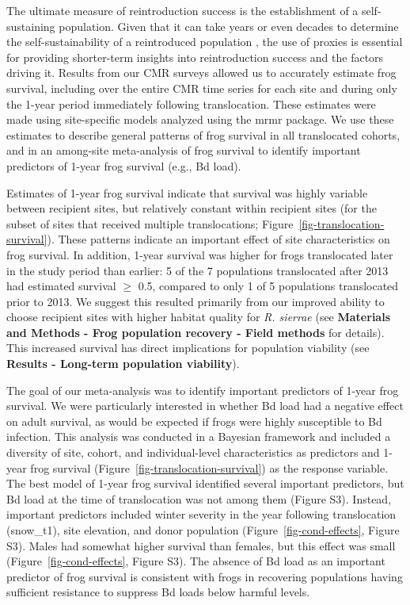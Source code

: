\documentclass[9pt,twocolumn,twoside,lineno]{pnas-new}
\begin{document}
The ultimate measure of reintroduction success is the establishment of a
self-sustaining population. Given that it can take years or even decades
to determine the self-sustainability of a reintroduced population
\citep[for an example in MYL frogs, see][]{joseph2018}, the use of
proxies is essential for providing shorter-term insights into
reintroduction success and the factors driving it. Results from our CMR
surveys allowed us to accurately estimate frog survival, including over
the entire CMR time series for each site and during only the 1-year
period immediately following translocation. These estimates were made
using site-specific models analyzed using the mrmr package. We use these
estimates to describe general patterns of frog survival in all
translocated cohorts, and in an among-site meta-analysis of frog
survival to identify important predictors of 1-year frog survival (e.g.,
Bd load).

Estimates of 1-year frog survival indicate that survival was highly
variable between recipient sites, but relatively constant within
recipient sites (for the subset of sites that received multiple
translocations; Figure~\ref{fig-translocation-survival}). These patterns
indicate an important effect of site characteristics on frog survival.
In addition, 1-year survival was higher for frogs translocated later in
the study period than earlier: 5 of the 7 populations translocated after
2013 had estimated survival \(\ge\) 0.5, compared to only 1 of 5
populations translocated prior to 2013. We suggest this resulted
primarily from our improved ability to choose recipient sites with
higher habitat quality for \emph{R. sierrae} (see \textbf{Materials and
Methods - Frog population recovery - Field methods} for details). This
increased survival has direct implications for population viability (see
\textbf{Results - Long-term population viability}).

The goal of our meta-analysis was to identify important predictors of
1-year frog survival. We were particularly interested in whether Bd load
had a negative effect on adult survival, as would be expected if frogs
were highly susceptible to Bd infection. This analysis was conducted in
a Bayesian framework and included a diversity of site, cohort, and
individual-level characteristics as predictors and 1-year frog survival
(Figure~\ref{fig-translocation-survival}) as the response variable. The
best model of 1-year frog survival identified several important
predictors, but Bd load at the time of translocation was not among them
(Figure S3). Instead, important predictors
included winter severity in the year following translocation (snow\_t1),
site elevation, and donor population (Figure~\ref{fig-cond-effects},
Figure S3). Males had somewhat higher
survival than females, but this effect was small
(Figure~\ref{fig-cond-effects}, Figure S3).
The absence of Bd load as an important predictor of frog survival is
consistent with frogs in recovering populations having sufficient
resistance to suppress Bd loads below harmful levels.
\end{document}

